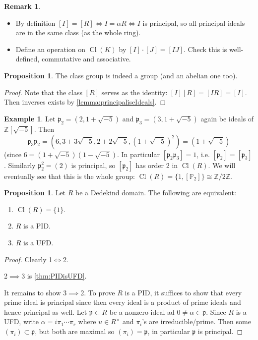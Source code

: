 \documentclass{article}
\newcommand{\p}{\mathbb{P}}
\newcommand{\Z}{\mathbb{Z}}
\newcommand{\Cl}{\operatorname{Cl}}
\newcommand{\ip}{\mathfrak{p}}
\theoremstyle{definition}
\newtheorem{prop}[defn]{Proposition}
\newtheorem{example}[defn]{Example}
\newtheorem{remark}[defn]{Remark}
\begin{document}
\begin{remark}
\begin{itemize}
\item By definition $[I]=[R]\iff I=\alpha R\iff I$ is principal, so all principal ideals are in the same class (as the whole ring).
\item Define an operation on $\Cl(K)$ by $[I]\cdot [J]=[IJ]$. Check this is well-defined, commutative and associative.
\end{itemize}
\end{remark}

\begin{prop}
The class group is indeed a group (and an abelian one too).
\end{prop}
\begin{proof}
Note that the class $[R]$ serves as the identity: $[I][R]=[IR]=[I]$. Then inverses exists by \ref{lemma:principaliseIdeals}.
\end{proof}

\begin{example}
\label{example:p2p3isprincipal}
Let $\ip_2=\left(2,1+\sqrt{-5}\right)$ and $\ip_3=\left(3,1+\sqrt{-5}\right)$ again be ideals of $\Z\left[\sqrt{-5}\right]$. Then
\[
\ip_3\ip_2=\left(6,3+3\sqrt{-5},2+2\sqrt{-5},\left(1+\sqrt{-5}\right)^2\right)=\left(1+\sqrt{-5}\right)
\](since $6=\left(1+\sqrt{-5}\right)\left(1-\sqrt{-5}\right)$. In particular $[\ip_2\ip_3]=1$, i.e. $[\ip_2]=[\ip_3]$. Similarly $\ip_2^2=(2)$ is principal, so $[\ip_2]$ has order 2 in $\Cl(R)$. We will eventually see that this is the whole group: $\Cl(R)=\{1,[\p_2]\}\cong\Z/2\Z$.
\end{example}

\begin{prop}
\label{prop:DDUFDiffclgrptriv}
Let $R$ be a Dedekind domain. The following are equivalent:
\begin{enumerate}
\item $\Cl(R)=\{1\}$.
\item $R$ is a PID.
\item $R$ is a UFD.
\end{enumerate}
\end{prop}
\begin{proof}
Clearly 1$\iff$2.

2$\implies$3 is \ref{thm:PIDisUFD}.

It remains to show 3$\implies$2. To prove $R$ is a PID, it suffices to show that every prime ideal is principal since then every ideal is a product of prime ideals and hence principal as well. Let $\ip\subset R$ be a nonzero ideal ad $0\neq\alpha\in\ip$. Since $R$ is a UFD, write $\alpha=i\pi_1\cdots\pi_r$ where $u\in R^\times$ and $\pi_i$'s are irreducible/prime. Then some $(\pi_i)\subset\ip$, but both are maximal so $(\pi_i)=\ip$, in particular $\ip$ is principal.
\end{proof}
\end{document}
